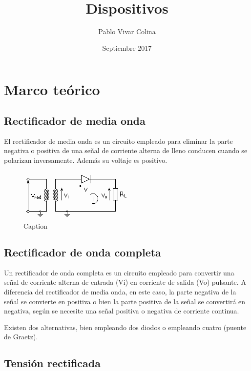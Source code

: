 \documentclass{article}
\title{Dispositivos}
\author{Pablo Vivar Colina}
\date{Septiembre 2017}
\begin{document}


\section{Marco teórico}

\subsection{Rectificador de media onda}

El rectificador de media onda es un circuito empleado para eliminar la parte negativa o positiva de una señal de corriente alterna de lleno conducen cuando se polarizan inversamente. Además su voltaje es positivo.\citep{circuitoMediaOnda}

\begin{figure}[h!]
    \centering
    \includegraphics{Circuito_rectificador_media_onda.png}
    \caption{Caption}
    \label{fig:rectificadorMedia}
\end{figure}

\subsection{Rectificador de onda completa}

Un rectificador de onda completa es un circuito empleado para convertir una señal de corriente alterna de entrada (Vi) en corriente de salida (Vo) pulsante. A diferencia del rectificador de media onda, en este caso, la parte negativa de la señal se convierte en positiva o bien la parte positiva de la señal se convertirá en negativa, según se necesite una señal positiva o negativa de corriente continua.

Existen dos alternativas, bien empleando dos diodos o empleando cuatro (puente de Graetz).\citep{circuitoOnda}

\subsection{Tensión rectificada}
\end{document}
